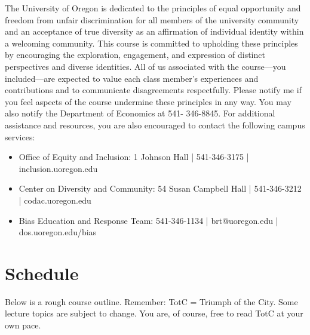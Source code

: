 \documentclass[11pt]{article}
\begin{document}
	The University of Oregon is dedicated to the principles of equal opportunity and freedom from unfair discrimination for all members of the university community and an acceptance of true diversity as an affirmation of individual identity within a welcoming community. This course is committed to upholding these principles by encouraging the exploration, engagement, and expression of distinct perspectives and diverse identities.
	All of us associated with the course—you included—are expected to value each class member’s experiences and contributions and to communicate disagreements respectfully. Please notify me if you feel aspects of the course undermine these principles in any way. You may also notify the Department of Economics at 541- 346-8845. For additional assistance and resources, you are also encouraged to contact the following campus services:
	\begin{itemize}
		\item Office of Equity and Inclusion: 1 Johnson Hall | 541-346-3175 | inclusion.uoregon.edu
		\item Center on Diversity and Community: 54 Susan Campbell Hall | 541-346-3212 | codac.uoregon.edu
		\item Bias Education and Response Team: 541-346-1134 | brt@uoregon.edu | dos.uoregon.edu/bias
		
	\end{itemize}
	
	\newpage
	\section*{Schedule}
	
	Below is a rough course outline. Remember: TotC = Triumph of the City. Some lecture topics are subject to change. You are, of course, free to read TotC at your own pace. 
	
\end{document}
